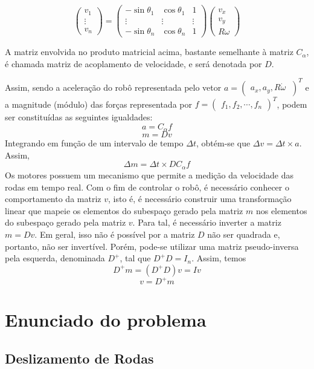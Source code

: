 \documentclass{article}
\begin{document}
\[
\begin{pmatrix}v_{1}\\ \vdots \\ v_{n} \end{pmatrix}
=
\begin{pmatrix}
  -\sin\theta_1 & \cos\theta_1  & 1 \\
  \vdots & \vdots & \vdots  \\
  -\sin\theta_n & \cos\theta_n  & 1
 \end{pmatrix}
\begin{pmatrix}v_{x}\\ v_y \\ R\omega \end{pmatrix}
\]

A matriz envolvida no produto matricial acima, bastante semelhante à matriz $C_\alpha$, é chamada matriz de acoplamento de velocidade, e será denotada por $D$.

Assim, sendo a aceleração do robô representada pelo vetor $a=\begin{pmatrix}a_{x},a_{y},R\dot{\omega}\ \end{pmatrix}^T$ e a magnitude (módulo) das forças representada por $f=\begin{pmatrix}f_{1},f_{2},\cdots,f_{n} \end{pmatrix}^T$, podem ser constituídas as seguintes igualdades:
\[a=C_{\alpha}f\]
\[m=Dv\]
\hspace{1cm}Integrando em função de um intervalo de tempo $\Delta t$, obtém-se que $\Delta v=\Delta t \times a$. Assim,
\[\Delta m=\Delta t\times DC_{\alpha}f\]
\hspace{1cm}Os motores possuem um mecanismo que permite a medição da velocidade das rodas em tempo real. Com o fim de controlar o robô, é necessário conhecer o comportamento da matriz $v$, isto é, é necessário construir uma transformação linear que mapeie os elementos do subespaço gerado pela matriz $m$ nos elementos do subespaço gerado pela matriz $v$.
Para tal, é necessário inverter a matriz $m=Dv$. Em geral, isso não é possível por a matriz $D$ não ser quadrada e, portanto, não ser invertível. Porém, pode-se utilizar uma matriz pseudo-inversa pela esquerda, denominada $D^+$, tal que $D^+ D=I_n$. Assim, temos 
\[D^+m=(D^+D)v=Iv\]
\[v=D^+m\]


\section{Enunciado do problema}
\subsection{Deslizamento de Rodas}
\end{document}

